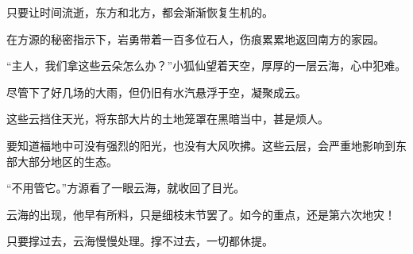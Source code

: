 \begin{this_body}
只要让时间流逝，东方和北方，都会渐渐恢复生机的。

在方源的秘密指示下，岩勇带着一百多位石人，伤痕累累地返回南方的家园。

“主人，我们拿这些云朵怎么办？”小狐仙望着天空，厚厚的一层云海，心中犯难。

尽管下了好几场的大雨，但仍旧有水汽悬浮于空，凝聚成云。

这些云挡住天光，将东部大片的土地笼罩在黑暗当中，甚是烦人。

要知道福地中可没有强烈的阳光，也没有大风吹拂。这些云层，会严重地影响到东部大部分地区的生态。

“不用管它。”方源看了一眼云海，就收回了目光。

云海的出现，他早有所料，只是细枝末节罢了。如今的重点，还是第六次地灾！

只要撑过去，云海慢慢处理。撑不过去，一切都休提。

\end{this_body}


